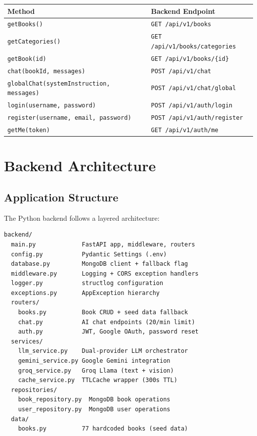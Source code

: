 \documentclass[11pt,a4paper]{article}
\begin{document}
\begin{center}
\begin{tabular}{@{}ll@{}}
\toprule
\textbf{Method} & \textbf{Backend Endpoint} \\
\midrule
\texttt{getBooks()} & \texttt{GET /api/v1/books} \\
\texttt{getCategories()} & \texttt{GET /api/v1/books/categories} \\
\texttt{getBook(id)} & \texttt{GET /api/v1/books/\{id\}} \\
\texttt{chat(bookId, messages)} & \texttt{POST /api/v1/chat} \\
\texttt{globalChat(systemInstruction, messages)} & \texttt{POST /api/v1/chat/global} \\
\texttt{login(username, password)} & \texttt{POST /api/v1/auth/login} \\
\texttt{register(username, email, password)} & \texttt{POST /api/v1/auth/register} \\
\texttt{getMe(token)} & \texttt{GET /api/v1/auth/me} \\
\bottomrule
\end{tabular}
\end{center}
\clearpage

\section{Backend Architecture}

\subsection{Application Structure}

The Python backend follows a layered architecture:

\begin{verbatim}
backend/
  main.py             FastAPI app, middleware, routers
  config.py           Pydantic Settings (.env)
  database.py         MongoDB client + fallback flag
  middleware.py       Logging + CORS exception handlers
  logger.py           structlog configuration
  exceptions.py       AppException hierarchy
  routers/
    books.py          Book CRUD + seed data fallback
    chat.py           AI chat endpoints (20/min limit)
    auth.py           JWT, Google OAuth, password reset
  services/
    llm_service.py    Dual-provider LLM orchestrator
    gemini_service.py Google Gemini integration
    groq_service.py   Groq Llama (text + vision)
    cache_service.py  TTLCache wrapper (300s TTL)
  repositories/
    book_repository.py  MongoDB book operations
    user_repository.py  MongoDB user operations
  data/
    books.py          77 hardcoded books (seed data)
\end{verbatim}
\end{document}
